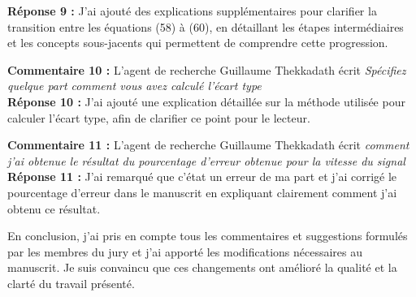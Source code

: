 \documentclass[superscriptaddress,12pt]{article}
\begin{document}
\textbf{Réponse 9 :} J'ai ajouté des explications supplémentaires pour clarifier la transition entre les équations (58) à (60), en détaillant les étapes intermédiaires et les concepts sous-jacents qui permettent de comprendre cette progression.

\vspace{1cm}

\textbf{Commentaire 10 :} L'agent de recherche Guillaume Thekkadath écrit \textit{Spécifiez quelque part comment vous avez calculé l'écart type } \\
\textbf{Réponse 10 :} J'ai ajouté une explication détaillée sur la méthode utilisée pour calculer l'écart type, afin de clarifier ce point pour le lecteur.

\vspace{1cm}

\textbf{Commentaire 11 :} L'agent de recherche Guillaume Thekkadath écrit \textit{comment j'ai obtenue le résultat du pourcentage d'erreur obtenue pour la vitesse du signal } \\
\textbf{Réponse 11 :} J'ai remarqué que c'état un erreur de ma part et j'ai corrigé le pourcentage d'erreur dans le manuscrit en expliquant clairement comment j'ai obtenu ce résultat.

\vspace{1cm}

En conclusion, j'ai pris en compte tous les commentaires et suggestions formulés par les membres du jury et j'ai apporté les modifications nécessaires au manuscrit. Je suis convaincu que ces changements ont amélioré la qualité et la clarté du travail présenté.
\end{document}
